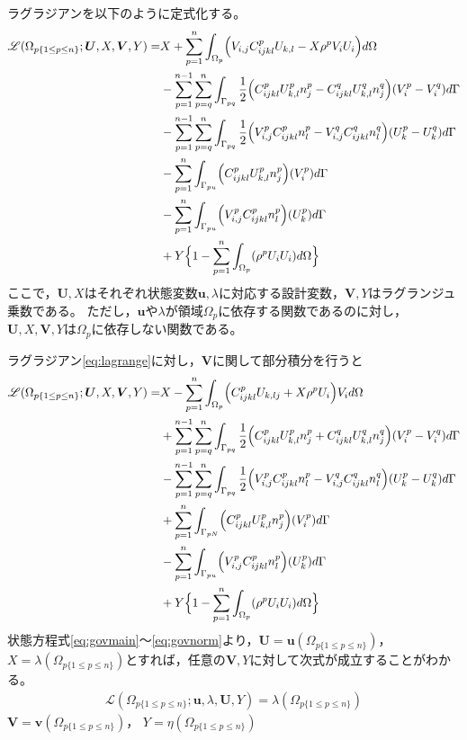 ラグラジアンを以下のように定式化する。
\begin{align}
	\mathscr{L}(\Omega_{p\{1\leq p\leq n\}};\bm{U},X,\bm{V},Y)=
	&X+\sum_{p=1}^{n}\int_{\Omega_p}\Bigr( V_{i,j}C_{ijkl}^{p}U_{k,l}-X\rho^{p}V_{i}U_{i}\Bigl) d\Omega
	\nonumber
	\\
	&-\sum_{p=1}^{n-1}\sum_{p=q}^{n}\int_{\Gamma_{pq}}\frac{1}{2}\Bigr(C_{ijkl}^{p}U_{k,l}^{p}n_{j}^{p}-C_{ijkl}^{q}U_{k,l}^{q}n_{j}^{q}\Bigl)(V_{i}^{p}-V_{i}^{q}) d\Gamma
	\nonumber
	\\
	&-\sum_{p=1}^{n-1}\sum_{p=q}^{n}\int_{\Gamma_{pq}}\frac{1}{2}\Bigr(V_{i,j}^{p}C_{ijkl}^{p}n_{l}^{p}-V_{i,j}^{q}C_{ijkl}^{q}n_{l}^{q}\Bigl)(U_{k}^{p}-U_{k}^{q})d\Gamma
	\nonumber
	\\
	&-\sum_{p=1}^{n}\int_{\Gamma_{pu}}\Bigr(C_{ijkl}^{p}U_{k,l}^{p}n_{j}^{p}\Bigl)(V_{i}^{p}) d\Gamma
	\nonumber
	\\
	&-\sum_{p=1}^{n}\int_{\Gamma_{pu}}\Bigr(V_{i,j}^{p}C_{ijkl}^{p}n_{l}^{p}\Bigl)(U_{k}^{p}) d\Gamma
	\nonumber
	\\
	&+Y\Bigr\{1- \sum_{p=1}^{n}\int_{\Omega_{p}}(\rho^{p}U_{i}U_{i}) d\Omega \Bigl\}
	\label{eq:lagrange}
\end{align}
ここで，$\bm{U},X$はそれぞれ状態変数$\bm{u},\lambda$に対応する設計変数，$\bm{V},Y$はラグランジュ乗数である。
ただし，$\bm{u}$や$\lambda$が領域$\Omega_p$に依存する関数であるのに対し，$\bm{U},X,\bm{V},Y$は$\Omega_p$に依存しない関数である。

ラグラジアン\eqref{eq:lagrange}に対し，$\bm{V}$に関して部分積分を行うと
\begin{align}
	\mathscr{L}(\Omega_{p\{1\leq p\leq n\}};\bm{U},X,\bm{V},Y)=&X-\sum_{p=1}^{n}\int_{\Omega_p}\Bigr(C_{ijkl}^{p}U_{k,lj}+X\rho^{p}U_{i}\Bigl)V_{i} d\Omega
	\nonumber
	\\
	&+\sum_{p=1}^{n-1}\sum_{p=q}^{n}\int_{\Gamma_{pq}}\frac{1}{2}\Bigr(C_{ijkl}^{p}U_{k,l}^{p}n_{j}^{p}+C_{ijkl}^{q}U_{k,l}^{q}n_{j}^{q}\Bigl)(V_{i}^{p}-V_{i}^{q}) d\Gamma
	\nonumber
	\\
	&-\sum_{p=1}^{n-1}\sum_{p=q}^{n}\int_{\Gamma_{pq}}\frac{1}{2}\Bigr(V_{i,j}^{p}C_{ijkl}^{p}n_{l}^{p}-V_{i,j}^{q}C_{ijkl}^{q}n_{l}^{q}\Bigl)(U_{k}^{p}-U_{k}^{q})d\Gamma
	\nonumber
	\\
	&+\sum_{p=1}^{n}\int_{\Gamma_{pN}}\Bigr(C_{ijkl}^{p}U_{k,l}^{p}n_{j}^{p}\Bigl)(V_{i}^{p}) d\Gamma
	\nonumber
	\\
	&-\sum_{p=1}^{n}\int_{\Gamma_{pu}}\Bigr(V_{i,j}^{p}C_{ijkl}^{p}n_{l}^{p}\Bigl)(U_{k}^{p}) d\Gamma
	\nonumber
	\\
	&+Y\Bigr\{1- \sum_{p=1}^{n}\int_{\Omega_{p}}(\rho^{p}U_{i}U_{i}) d\Omega \Bigl\}
	\nonumber
	\\
	\label{eq:lagrange_wint}
\end{align}
状態方程式\eqref{eq:govmain}～\eqref{eq:govnorm}より，$\bm{U}=\bm{u}(\Omega_{p\{1\leq p\leq n\}})$，
$X=\lambda(\Omega_{p\{1\leq p\leq n\}})$とすれば，任意の$\bm{V},Y$に対して次式が成立することがわかる。
\begin{align}
	\mathscr{L}(\Omega_{p\{1\leq p\leq n\}};\bm{u},\lambda,\bm{U},Y)=\lambda(\Omega_{p\{1\leq p\leq n\}})
\end{align}
$\bm{V}=\bm{v}(\Omega_{p\{1\leq p\leq n\}})$，
$Y=\eta(\Omega_{p\{1\leq p\leq n\}})$

